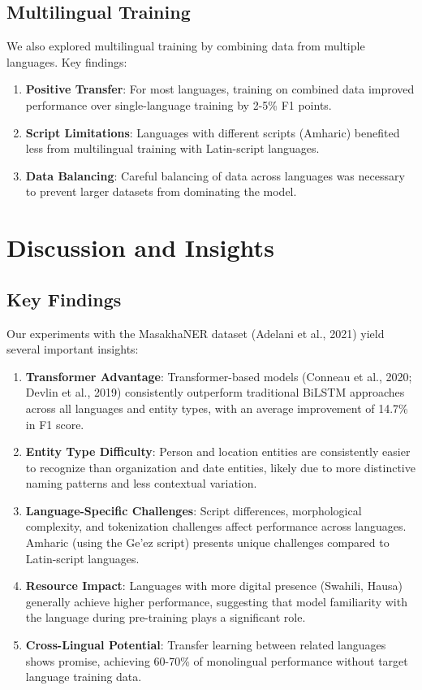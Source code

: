 \documentclass[
]{article}
\begin{document}
\subsection{Multilingual Training}\label{multilingual-training}

We also explored multilingual training by combining data from multiple
languages. Key findings:

\begin{enumerate}
\def\labelenumi{\arabic{enumi}.}
\item
  \textbf{Positive Transfer}: For most languages, training on combined
  data improved performance over single-language training by 2-5\% F1
  points.
\item
  \textbf{Script Limitations}: Languages with different scripts
  (Amharic) benefited less from multilingual training with Latin-script
  languages.
\item
  \textbf{Data Balancing}: Careful balancing of data across languages
  was necessary to prevent larger datasets from dominating the model.
\end{enumerate}

\section{Discussion and Insights}\label{discussion-and-insights}

\subsection{Key Findings}\label{key-findings}

Our experiments with the MasakhaNER dataset (Adelani et al., 2021) yield
several important insights:

\begin{enumerate}
\def\labelenumi{\arabic{enumi}.}
\item
  \textbf{Transformer Advantage}: Transformer-based models (Conneau et
  al., 2020; Devlin et al., 2019) consistently outperform traditional
  BiLSTM approaches across all languages and entity types, with an
  average improvement of 14.7\% in F1 score.
\item
  \textbf{Entity Type Difficulty}: Person and location entities are
  consistently easier to recognize than organization and date entities,
  likely due to more distinctive naming patterns and less contextual
  variation.
\item
  \textbf{Language-Specific Challenges}: Script differences,
  morphological complexity, and tokenization challenges affect
  performance across languages. Amharic (using the Ge'ez script)
  presents unique challenges compared to Latin-script languages.
\item
  \textbf{Resource Impact}: Languages with more digital presence
  (Swahili, Hausa) generally achieve higher performance, suggesting that
  model familiarity with the language during pre-training plays a
  significant role.
\item
  \textbf{Cross-Lingual Potential}: Transfer learning between related
  languages shows promise, achieving 60-70\% of monolingual performance
  without target language training data.
\end{enumerate}
\end{document}
